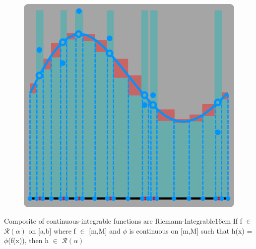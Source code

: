     \begin{figure}[h]
        \centering
        \includegraphics[scale=0.35]{Images/13.2.3.png}
    \end{figure}

    \newpage



    \begin{wtheorem}
    {Composite of continuous-integrable functions are Riemann-Integrable}{16cm}
        If f $\in$ $\mathscr{R}(\alpha)$ on [a,b] where f $\in$ [m,M] and
        $\phi$ is continuous on [m,M] such that h(x) = $\phi$(f(x)), then
        h $\in$ $\mathscr{R}(\alpha)$        
    \end{wtheorem}


